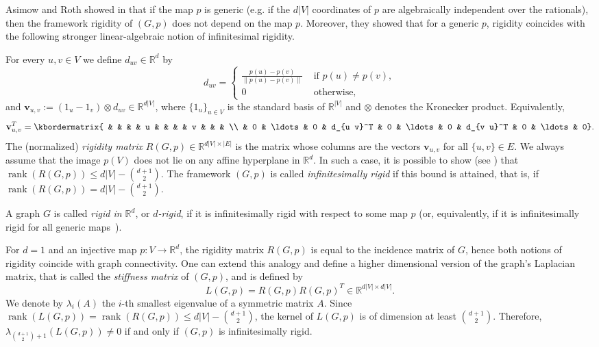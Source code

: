 \documentclass[a4paper,11pt]{article}
\theoremstyle{plain}
\theoremstyle{definition}
\newcommand{\Rea}{{\mathbb R}}
\DeclareMathOperator{\rank}{\text{rank}}
\newcommand{\bv}{\mathbf v}
\begin{document}
Asimow and Roth showed in \cite{AR1} that if the map $p$ is generic (e.g. if the $d|V|$ coordinates of $p$ are algebraically independent over the rationals), then the framework rigidity of $(G,p)$ does not depend on the map $p$. Moreover, they showed that for a generic $p$, rigidity coincides with the following stronger linear-algebraic notion of infinitesimal rigidity. 

For every  $u,v\in V$ we define $d_{uv}\in \Rea^d$ by
\[
    d_{u v}=\begin{cases}
           \frac{p(u)-p(v)}{\|p(u)-p(v)\|} & \text{ if } p(u)\neq p(v),\\
            0 & \text{ otherwise,}
    \end{cases}
\]
and $\bv_{u,v}:= (1_u-1_v)\otimes d_{u v}\in \Rea^{d|V|}$,
where $\{1_u\}_{u\in V}$ is the standard basis of $\Rea^{|V|}$ and $\otimes$ denotes the Kronecker product.
 Equivalently,
\[
   \bv_{u,v} ^T= \kbordermatrix{
     & &  &  & u & & & & v & & & \\
     & 0 & \ldots & 0 & d_{u v}^T & 0 & \ldots & 0 & d_{v u}^T & 0 & \ldots & 0}.
\]
 The (normalized) \emph{rigidity matrix} $R(G,p)\in \Rea^{d|V|\times |E|}$ is the matrix whose columns are the vectors $\bv_{u,v}$ for all $\{u,v\}\in E$.
We always assume that the image $p(V)$ does not lie on any affine hyperplane in $\Rea^d$. In such a case, it is possible to show (see \cite{AR1}) that $\rank(R(G,p))\leq d|V|-\binom{d+1}{2}$. The framework $(G,p)$ is called \emph{infinitesimally rigid} if this bound is attained, that is, if $\rank(R(G,p))= d|V|-\binom{d+1}{2}$.

A graph $G$ is called \emph{rigid in $\Rea^d$}, or \emph{$d$-rigid}, if it is
infinitesimally rigid with respect to some map $p$ (or, equivalently, if it is infinitesimally rigid for all generic maps~\cite{AR1}).

For $d=1$ and an injective map $p:V\to \Rea^d$, the rigidity matrix $R(G,p)$ is equal to the incidence matrix of $G$, hence both notions of rigidity coincide with graph connectivity. One can extend this analogy and define a higher dimensional version of the graph's Laplacian matrix, that is called the \emph{stiffness matrix} of $(G,p)$, and is defined by
\[
    L(G,p)=R(G,p) R(G,p)^T \in \Rea^{d|V|\times d|V|}.
\] 
We denote by $\lambda_i(A)$ the $i$-th smallest eigenvalue of a symmetric matrix $A$.
Since $\rank(L(G,p))=\rank(R(G,p))\le d|V|-\binom{d+1}{2}$, the kernel of $L(G,p)$ is of dimension at least $\binom{d+1}{2}$. Therefore, $\lambda_{\binom{d+1}{2}+1}(L(G,p))\neq 0$ if and only if $(G,p)$ is infinitesimally rigid. 
\end{document}

